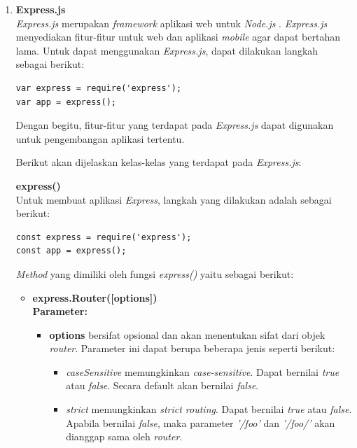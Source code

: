 \documentclass[a4paper,twoside]{article}
\begin{document}
\begin{enumerate}
\begin{enumerate}
			
			
			\item \textbf{Express.js} \\
			\textit{Express.js} merupakan \textit{framework} aplikasi web untuk \textit{Node.js} \cite{expressjs}. \textit{Express.js} menyediakan fitur-fitur untuk web dan aplikasi \textit{mobile} agar dapat bertahan lama. Untuk dapat menggunakan \textit{Express.js}, dapat dilakukan langkah sebagai berikut: 
\begin{lstlisting}
var express = require('express');
var app = express();
\end{lstlisting}
			
			Dengan begitu, fitur-fitur yang terdapat pada \textit{Express.js} dapat digunakan untuk pengembangan aplikasi tertentu.
			
			Berikut akan dijelaskan kelas-kelas yang terdapat pada \textit{Express.js}:
			
			\textbf{express()} \\
			Untuk membuat aplikasi \textit{Express}, langkah yang dilakukan adalah sebagai berikut:
\begin{lstlisting}
const express = require('express');
const app = express();
\end{lstlisting}
			
			\textit{Method} yang dimiliki oleh fungsi \textit{express()} yaitu sebagai berikut:
			
			\begin{itemize}
				\item \textbf{express.Router([options])} \\ \textbf{Parameter:} 
				\begin{itemize}
					\item \textbf{options} bersifat opsional dan akan menentukan sifat dari objek \textit{router}. Parameter ini dapat berupa beberapa jenis seperti berikut:
					\begin{itemize}
						\item \textit{caseSensitive} memungkinkan \textit{case-sensitive}. Dapat bernilai \textit{true} atau \textit{false}. Secara default akan bernilai \textit{false}.
						
						\item \textit{strict} memungkinkan \textit{strict routing}. Dapat bernilai \textit{true} atau \textit{false}. Apabila bernilai \textit{false}, maka parameter \textit{'/foo'} dan \textit{'/foo/'} akan dianggap sama oleh \textit{router}.
					\end{itemize}
				\end{itemize}
				

\end{itemize}
\end{enumerate}
\end{enumerate}
\end{document}
